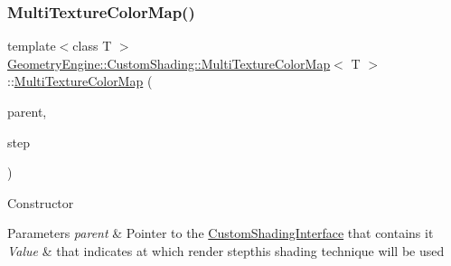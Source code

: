 \subsubsection{\texorpdfstring{MultiTextureColorMap()}{MultiTextureColorMap()}\hspace{0.1cm}{\footnotesize\ttfamily [1/2]}}
{\footnotesize\ttfamily template$<$class T $>$ \\
\mbox{\hyperlink{class_geometry_engine_1_1_custom_shading_1_1_multi_texture_color_map}{Geometry\+Engine\+::\+Custom\+Shading\+::\+Multi\+Texture\+Color\+Map}}$<$ T $>$\+::\mbox{\hyperlink{class_geometry_engine_1_1_custom_shading_1_1_multi_texture_color_map}{Multi\+Texture\+Color\+Map}} (\begin{DoxyParamCaption}\item[{\mbox{\hyperlink{class_geometry_engine_1_1_custom_shading_1_1_custom_shading_interface}{Custom\+Shading\+Interface}} $\ast$}]{parent,  }\item[{\mbox{\hyperlink{namespace_geometry_engine_1_1_custom_shading_a2dc236a5b567da5099069ce2b2be5609}{Custom\+Shading\+Steps}}}]{step }\end{DoxyParamCaption})\hspace{0.3cm}{\ttfamily [inline]}}

Constructor 
\begin{DoxyParams}{Parameters}
{\em parent} & Pointer to the \mbox{\hyperlink{class_geometry_engine_1_1_custom_shading_1_1_custom_shading_interface}{Custom\+Shading\+Interface}} that contains it \\
\hline
{\em Value} & that indicates at which render stepthis shading technique will be used \\
\hline
\end{DoxyParams}
\mbox{\label{class_geometry_engine_1_1_custom_shading_1_1_multi_texture_color_map_a76266fac65587fdc190620ae7c17e32b}} 
